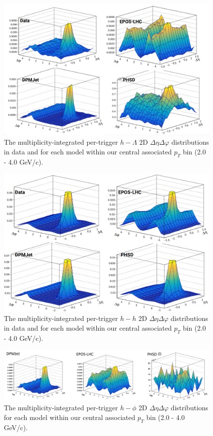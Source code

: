 \documentclass[ALICE,manyauthors]{ALICE_analysis_notes}
\begin{document}
\begin{figure}[ht]
\centering
\includegraphics[width=5in]{figures/h_lambda_2d_modelcomp.png}
\caption{The multiplicity-integrated per-trigger $h-\Lambda$ 2D $\Delta\eta\Delta\varphi$ distributions in data and for each model within our central associated $p_{T}$ bin (2.0 - 4.0 GeV/c).}
\label{h_lambda_2d_model}
\end{figure}

\begin{figure}[ht]
\centering
\includegraphics[width=5in]{figures/h_h_2d_modelcomp.png}
\caption{The multiplicity-integrated per-trigger $h-h$ 2D $\Delta\eta\Delta\varphi$ distributions in data and for each model within our central associated $p_{T}$ bin (2.0 - 4.0 GeV/c).}
\label{h_h_2d_model}
\end{figure}
\clearpage

\begin{figure}[ht]
\centering
\includegraphics[width=6in]{figures/h_phi_2d_modelcomp.png}
\caption{The multiplicity-integrated per-trigger $h-\phi$ 2D $\Delta\eta\Delta\varphi$ distributions for each model within our central associated $p_{T}$ bin (2.0 - 4.0 GeV/c).}
\label{h_phi_2d_model}
\end{figure}
\end{document}

